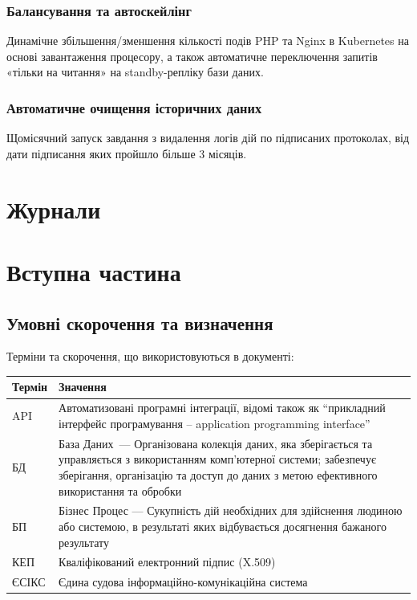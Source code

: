 \documentclass{article}
\begin{document}
\subsubsection{Балансування та автоскейлінг}
Динамічне збільшення/зменшення кількості подів PHP та Nginx в Kubernetes на основі завантаження процесору, а також автоматичне переключення запитів «тільки на читання» на standby-репліку бази даних.

\subsubsection{Автоматичне очищення історичних даних}
Щомісячний запуск завдання з видалення логів дій по підписаних протоколах, від дати підписання яких пройшло більше 3 місяців.

\section{Журнали}

\newpage
\section*{Вступна частина}

\subsection*{Умовні скорочення та визначення}

Терміни та скорочення, що використовуються в документі:

\begin{longtable}{p{4cm}p{10cm}}
\toprule
\textbf{Термін} & \textbf{Значення} \\
\midrule
API & Автоматизовані програмні інтеграції, відомі також як “прикладний інтерфейс програмування – application programming interface” \\
БД & База Даних — Організована колекція даних, яка зберігається та управляється з використанням комп'ютерної системи; забезпечує зберігання, організацію та доступ до даних з метою ефективного використання та обробки \\
БП & Бізнес Процес — Сукупність дій необхідних для здійснення людиною або системою, в результаті яких відбувається досягнення бажаного результату \\
КЕП & Кваліфікований електронний підпис (X.509) \\
ЄСІКС & Єдина судова інформаційно-комунікаційна система \\
\bottomrule
\end{longtable}
\end{document}

